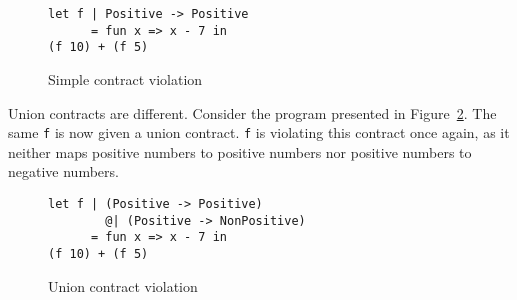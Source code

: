 \documentclass[sigplan,10pt]{acmart}
\newcommand{\nickel}[1]{\lstinline[language=nickel]{#1}}
\begin{document}
%

\begin{figure}[h]
\begin{lstlisting}[language=nickel]
let f | Positive -> Positive
      = fun x => x - 7 in
(f 10) + (f 5)
\end{lstlisting}
\caption{Simple contract violation}
\label{fig:pos-to-pos}
\end{figure}

%

Union contracts are different. Consider the program presented in
Figure~\ref{fig:wrong-union-function}. The same \nickel{f} is now given a union
contract. \nickel{f} is violating this contract once again, as it neither maps
positive numbers to positive numbers nor positive numbers to negative numbers.

\begin{figure}[h]
\begin{lstlisting}[language=nickel]
let f | (Positive -> Positive)
        @| (Positive -> NonPositive)
      = fun x => x - 7 in
(f 10) + (f 5)
\end{lstlisting}
\caption{Union contract violation}
\label{fig:wrong-union-function}
\end{figure}
\end{document}
